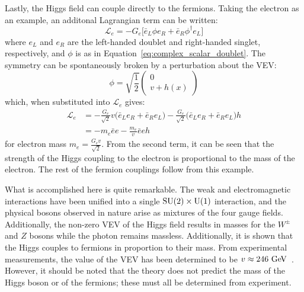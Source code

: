 Lastly, the Higgs field can couple directly to the fermions.
Taking the electron as an example, an additonal Lagrangian term can be written:
\begin{equation}
\mathcal{L}_e = -G_e \big[\bar{e}_{L}\phi e_R+\bar{e}_R\phi^{\dagger}e_L\big]
\end{equation}
where $e_L$ and $e_R$ are the left-handed doublet and right-handed singlet, respectively, and $\phi$ is as in Equation~\ref{eq:complex_scalar_doublet}.
The symmetry can be spontaneously broken by a perturbation about the VEV:
\begin{equation}
  \phi = \sqrt{\frac{1}{2}}
  \begin{pmatrix}
  0 \\ v+h(x)
  \end{pmatrix}
\end{equation}
which, when substituted into $\mathcal{L}_e$ gives:
\begin{equation}
  \begin{aligned}
    \mathcal{L}_e &= -\frac{G_e}{\sqrt{2}}v\big(\bar{e}_{L}e_{R}+\bar{e}_{R}e_{L}\big) - \frac{G_e}{\sqrt{2}}\big(\bar{e}_{L}e_{R}+\bar{e}_{R}e_{L}\big)h \\
                  &= -m_e\bar{e}e-\frac{m_e}{v}\bar{e}eh
  \end{aligned}
\end{equation}
for electron mass $m_e = \frac{G_{e}v}{\sqrt{2}}$.
From the second term, it can be seen that the strength of the Higgs coupling to the electron is proportional to the mass of the electron.
The rest of the fermion couplings follow from this example.

What is accomplished here is quite remarkable.
The weak and electromagnetic interactions have been unified into a single $\textrm{SU}(2)\times\textrm{U}(1)$ interaction, and the physical bosons observed in nature arise as mixtures of the four gauge fields.
Additionally, the non-zero VEV of the Higgs field results in masses for the $W^{\pm}$ and $Z$ bosons while the photon remains massless.
Additionally, it is shown that the Higgs couples to fermions in proportion to their mass.
From experimental measurements, the value of the VEV has been determined to be $v\approx 246\gev$~\cite{2014.pdg}.
However, it should be noted that the theory does not predict the mass of the Higgs boson or of the fermions; these must all be determined from experiment.
